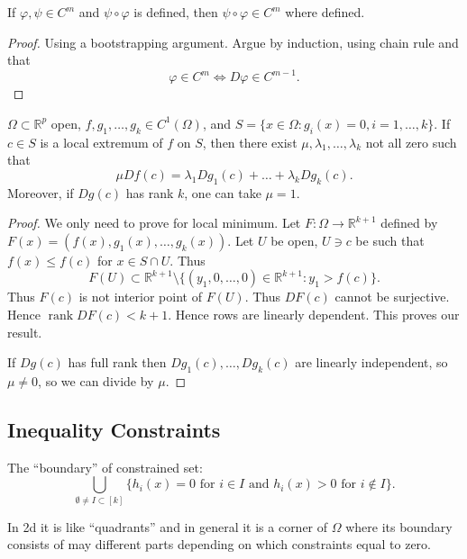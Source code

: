 
 \begin{lemma}
	If $\varphi, \psi \in C^m$ and $\psi \circ \varphi$ is defined, then $\psi \circ \varphi \in  C^m$ where defined.
\end{lemma}
\begin{proof}
	Using a bootstrapping argument. Argue by induction, using chain rule and that
	\[
		\varphi \in C^m \iff D \varphi \in C^{m-1}
	.\] 
\end{proof}

\begin{theorem}
	$\Omega \subset \mathbb{R}^p$ open, $f, g_1, \ldots, g_k \in C^1(\Omega)$, and $S = \{x \in \Omega: g_i(x) = 0, i = 1,\ldots,k\} $. If $c \in S$ is a local extremum of $f$ on $S$, then there exist $\mu, \lambda_1,\ldots,\lambda_k$ not all zero such that 
	\[
		\mu Df(c) = \lambda_1 Dg_1(c) + \ldots + \lambda_k Dg_k(c)
	.\] 
	Moreover, if $Dg(c)$ has rank $k$, one can take $\mu =1$.
\end{theorem}
\begin{proof}
	We only need to prove for local minimum. Let $F: \Omega \to \mathbb{R}^{k+1}$ defined by $F(x) = \left( f(x), g_1(x), \ldots, g_k(x) \right) $. Let $U$ be open, $U \ni c$ be such that $f(x) \le f(c)$ for $x \in S \cap U$. Thus
	\[
		F(U) \subset \mathbb{R}^{k+1} \setminus \{(y_1,0,\ldots,0) \in \mathbb{R}^{k+1}:y_1>f(c)\}
	.\] 
Thus $F(c)$ is not interior point of $F(U)$. Thus $DF(c)$ cannot be surjective. Hence $\operatorname{rank} DF(c) < k+1$. Hence rows are linearly dependent. This proves our result.

If $Dg(c)$ has full rank then $Dg_1(c),\ldots, Dg_k(c)$ are linearly independent, so $\mu\neq 0$, so we can divide by $\mu$.

\end{proof}

\subsection{Inequality Constraints}

The ``boundary'' of constrained set: 
 \[
	 \bigcup_{\emptyset \neq I \subset [k]} \{h_i(x) = 0 \text{ for } i \in I \text{ and }h_i(x) >0 \text{ for }i \not\in I\} 
.\] 

In 2d it is like ``quadrants'' and in general it is a corner of $\Omega$ where its boundary consists of may different parts depending on which constraints equal to zero.

